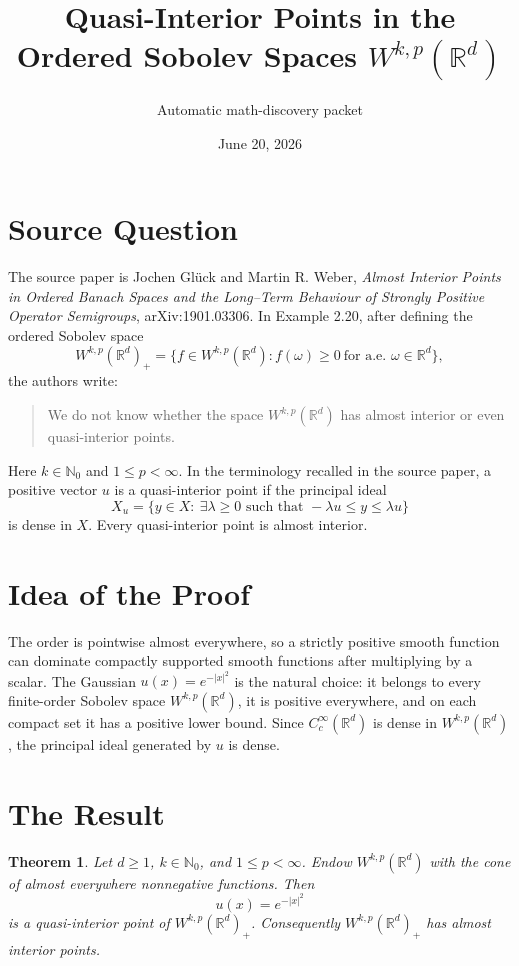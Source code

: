 \documentclass[11pt]{article}
\title{Quasi-Interior Points in the Ordered Sobolev Spaces \(W^{k,p}(\mathbb R^d)\)}
\author{Automatic math-discovery packet}
\date{June 20, 2026}
\newtheorem{theorem}{Theorem}
\newcommand{\R}{\mathbb R}
\begin{document}
\maketitle

\section*{Source Question}

The source paper is Jochen Gl\"uck and Martin R. Weber,
\emph{Almost Interior Points in Ordered Banach Spaces and the Long--Term Behaviour of Strongly Positive Operator Semigroups},
arXiv:1901.03306.  In Example 2.20, after defining the ordered Sobolev space
\[
    W^{k,p}(\R^d)_+
    =
    \{f\in W^{k,p}(\R^d): f(\omega)\geq0\ \text{for a.e. }\omega\in\R^d\},
\]
the authors write:

\begin{quote}
We do not know whether the space \(W^{k,p}(\mathbb R^d)\) has almost interior or
even quasi-interior points.
\end{quote}

Here \(k\in\mathbb N_0\) and \(1\leq p<\infty\).  In the terminology recalled in
the source paper, a positive vector \(u\) is a quasi-interior point if the
principal ideal
\[
    X_u=\{y\in X:\ \exists \lambda\geq0 \text{ such that } -\lambda u\leq y\leq \lambda u\}
\]
is dense in \(X\).  Every quasi-interior point is almost interior.

\section*{Idea of the Proof}

The order is pointwise almost everywhere, so a strictly positive smooth function
can dominate compactly supported smooth functions after multiplying by a scalar.
The Gaussian \(u(x)=e^{-|x|^2}\) is the natural choice: it belongs to every
finite-order Sobolev space \(W^{k,p}(\mathbb R^d)\), it is positive everywhere,
and on each compact set it has a positive lower bound.  Since
\(C_c^\infty(\mathbb R^d)\) is dense in \(W^{k,p}(\mathbb R^d)\), the principal
ideal generated by \(u\) is dense.

\section*{The Result}

\begin{theorem}
Let \(d\geq1\), \(k\in\mathbb N_0\), and \(1\leq p<\infty\).  Endow
\(W^{k,p}(\mathbb R^d)\) with the cone of almost everywhere nonnegative
functions.  Then
\[
    u(x)=e^{-|x|^2}
\]
is a quasi-interior point of \(W^{k,p}(\mathbb R^d)_+\).  Consequently
\(W^{k,p}(\mathbb R^d)_+\) has almost interior points.
\end{theorem}
\end{document}
